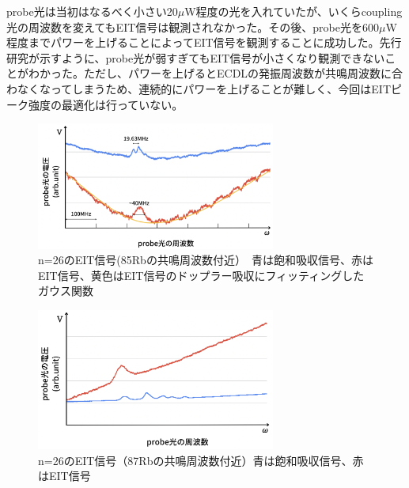 \documentclass[dvipdfmx]{jsreport}
\begin{document}
probe光は当初はなるべく小さい20$\mu$W程度の光を入れていたが、いくらcoupling光の周波数を変えてもEIT信号は観測されなかった。その後、probe光を600$\mu$W程度までパワーを上げることによってEIT信号を観測することに成功した。先行研究\cite{optimize}が示すように、probe光が弱すぎてもEIT信号が小さくなり観測できないことがわかった。ただし、パワーを上げるとECDLの発振周波数が共鳴周波数に合わなくなってしまうため、連続的にパワーを上げることが難しく、今回はEITピーク強度の最適化は行っていない。

\begin{figure}[hbtp]
\centering
\includegraphics[width=0.7\textwidth]{images/eit26.png}
\caption{\label{fig:eit26}n=26のEIT信号(85Rbの共鳴周波数付近）　青は飽和吸収信号、赤はEIT信号、黄色はEIT信号のドップラー吸収にフィッティングしたガウス関数}
\end{figure}
\begin{figure}[hbtp]
\centering
\includegraphics[width=0.7\textwidth]{images/eit87.png}
\caption{\label{fig:eit87}n=26のEIT信号（87Rbの共鳴周波数付近）青は飽和吸収信号、赤はEIT信号}
\end{figure}
\end{document}
